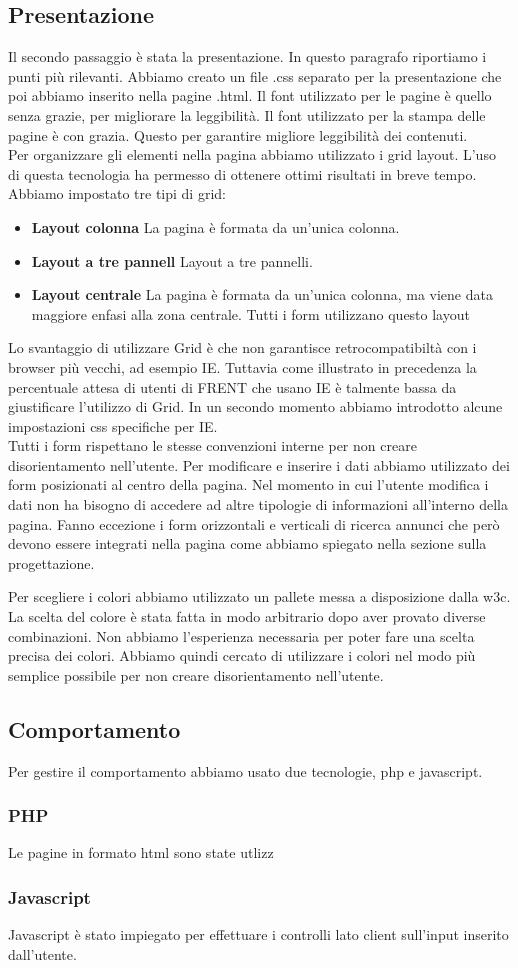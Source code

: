 \documentclass[1_relazione.tex]{subfiles}
\begin{document}
\subsection{Presentazione}
Il secondo passaggio è stata la presentazione. In questo paragrafo riportiamo i punti più rilevanti. Abbiamo creato un file .css separato per la presentazione che poi abbiamo inserito nella pagine .html. Il font utilizzato per le pagine è quello senza grazie, per migliorare la leggibilità. Il font utilizzato per la stampa delle pagine è con grazia. Questo per garantire migliore leggibilità dei contenuti.  \\
Per organizzare gli elementi nella pagina abbiamo utilizzato i grid layout. L'uso di questa tecnologia ha permesso di ottenere ottimi risultati in breve tempo. Abbiamo impostato tre tipi di grid:
\begin{itemize}
\item \textbf{Layout colonna}  La pagina è formata da un'unica colonna.
\item \textbf{Layout a tre pannell} Layout a tre pannelli.
\item \textbf{Layout centrale} La pagina è formata da un'unica colonna, ma viene data maggiore enfasi alla zona centrale. Tutti i form utilizzano questo layout
\end{itemize}

Lo svantaggio di utilizzare Grid è che non garantisce retrocompatibiltà con i browser più vecchi, ad esempio IE. Tuttavia come illustrato in precedenza la percentuale attesa di utenti di FRENT che usano IE è talmente bassa da giustificare l'utilizzo di Grid. In un secondo momento abbiamo introdotto alcune impostazioni css specifiche per IE. \\
Tutti i form rispettano le stesse convenzioni interne per non creare disorientamento nell'utente. Per modificare e inserire i dati abbiamo utilizzato dei form posizionati al centro della pagina. Nel momento in cui l'utente modifica i dati non ha bisogno di accedere ad altre tipologie di informazioni all'interno della pagina. Fanno eccezione i form orizzontali e verticali di ricerca annunci che però devono essere integrati nella pagina come abbiamo spiegato nella sezione sulla progettazione. 



Per scegliere i colori abbiamo utilizzato un pallete messa a disposizione dalla w3c. La scelta del colore è stata fatta in modo arbitrario dopo aver provato diverse combinazioni. Non abbiamo l'esperienza necessaria per poter fare una scelta precisa dei colori. Abbiamo quindi cercato di utilizzare i colori nel modo più semplice possibile per non creare disorientamento nell'utente.

\subsection{Comportamento}
Per gestire il comportamento abbiamo usato due tecnologie, php e javascript.

\subsubsection{PHP}
Le pagine in formato html sono state utlizz


\subsubsection{Javascript}
Javascript è stato impiegato per effettuare i controlli lato client sull'input inserito dall'utente.
\end{document}
